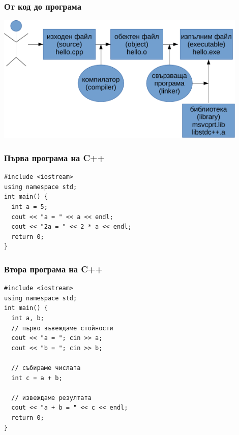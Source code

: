 \documentclass{beamer}
\begin{document}
\begin{frame}
  \frametitle{От код до програма}
  \includegraphics[width=0.9\textwidth]{images/compile.pdf}
\end{frame}

\begin{frame}[fragile]
  \frametitle{Първа програма на C++}
  \begin{lstlisting}
#include <iostream>
using namespace std;
int main() {
  int a = 5;
  cout << "a = " << a << endl;
  cout << "2a = " << 2 * a << endl;
  return 0;
}
  \end{lstlisting}
\end{frame}

\begin{frame}[fragile]
  \frametitle{Втора програма на C++}
\begin{lstlisting}
#include <iostream>
using namespace std;
int main() {
  int a, b;
  // първо въвеждаме стойности
  cout << "a = "; cin >> a;
  cout << "b = "; cin >> b;

  // събираме числата
  int c = a + b;

  // извеждаме резултата
  cout << "a + b = " << c << endl;
  return 0;
}
\end{lstlisting}
\end{frame}
\end{document}
